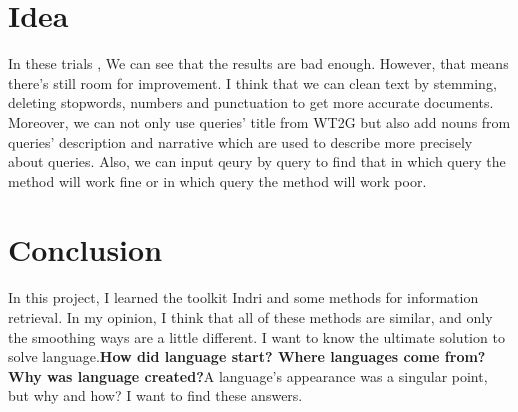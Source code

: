 \documentclass[a4pper,11pt,onecolumn]{article}
\begin{document}
\newpage

\section{Idea}
In these trials , We can see that the results are bad enough. However, that means there's still room for improvement. I think that we can clean text by stemming, deleting stopwords, numbers and punctuation to get more accurate documents. Moreover, we can not only use queries' title from WT2G but also add nouns from queries' description and narrative which are used to describe more precisely about queries. Also, we can input qeury by query to find that in which query the method will work fine or in which query the method will work poor.

\section{Conclusion}
In this project, I learned the toolkit Indri and some methods for information retrieval. In my opinion, I think that all of these methods are similar, and only the smoothing ways are a little different. I want to know the ultimate solution to solve language.\textbf{How did language start? Where languages come from? Why was language created?}A language's appearance was a singular point, but why and how? I want to find these answers.
\end{document}
